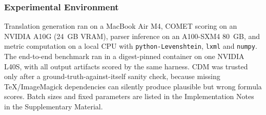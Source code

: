 \subsubsection{Experimental Environment}

Translation generation ran on a MacBook Air M4, COMET scoring on an NVIDIA A10G
(24~GB VRAM), parser inference on an A100-SXM4 80~GB, and metric
computation on a local CPU with \texttt{python-Levenshtein}, \texttt{lxml} and
\texttt{numpy}. The end-to-end benchmark ran in a digest-pinned container on one
NVIDIA L40S, with all output artifacts scored by the same harness. CDM was
trusted only after a ground-truth-against-itself sanity
check, because missing TeX/ImageMagick dependencies can silently produce
plausible but wrong formula scores. Batch sizes and fixed parameters are listed
in the Implementation Notes in the Supplementary Material.
